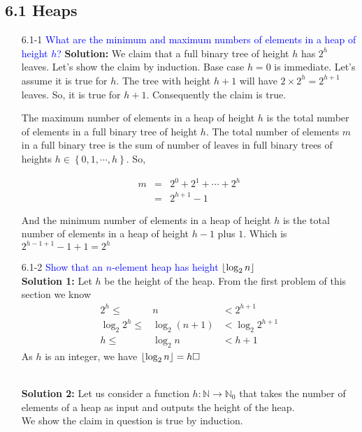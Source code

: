\documentclass{article}
\DeclarePairedDelimiter\floor{\lfloor}{\rfloor}
\begin{document}
\subsection*{6.1 Heaps}
\begin{enumerate}
    \item[6.1-1] \textcolor{blue}{What are the minimum and maximum numbers of elements in a heap of height $h$?}
    \textbf{Solution:} We claim that a full binary tree of height $h$ has $2^h$ leaves.
    Let's show the claim by induction. Base case $h=0$ is immediate. Let's assume it is true for $h$. The tree with height $h+1$ will have $2\times 2^h = 2^{h+1}$ leaves. So, it is true for $h+1$. Consequently the claim is true.
    
    The maximum number of elements in a heap of height $h$ is the total number of elements in a full binary tree of height $h$. The total number of elements $m$ in a full binary tree is the sum of number of leaves in full binary trees of heights $h \in \left\lbrace 0, 1, \cdots ,h\right\rbrace$. So,
    
    \begin{eqnarray*}
    m &=& 2^0 + 2^1 + \cdots + 2^h\\
    &=& 2^{h+1} - 1
    \end{eqnarray*}
    
    
    
    And the minimum number of elements in a heap of height $h$ is the total number of elements in a heap of height $h-1$ plus $1$. Which is $2^{h-1+1}-1+1 = 2^h$
    
    
    \item[6.1-2] \textcolor{blue}{Show that an $n$-element heap has height $\floor{\log_2 n}$ }
    \textbf{\\Solution 1:} Let $h$ be the height of the heap. From the first problem of this section we know 
    \begin{eqnarray*}
    2^{h} \leq &n& < 2^{h+1}\\
    \log_2 2^{h}\leq &\log_2(n + 1)& < \log_2 2^{h+1}\\
    h\leq &\log_2n& < h+1
    \end{eqnarray*}
    As $h$ is an integer, we have $\floor{\log_2 n} = h \hfill \square$
    
    \textbf{\\Solution 2:} Let us consider a function $h: \mathbb{N} \rightarrow \mathbb{N}_0$ that takes the number of elements of a heap as input and outputs the height of the heap. \\ We show the claim in question is true by induction.
    

\end{enumerate}
\end{document}
